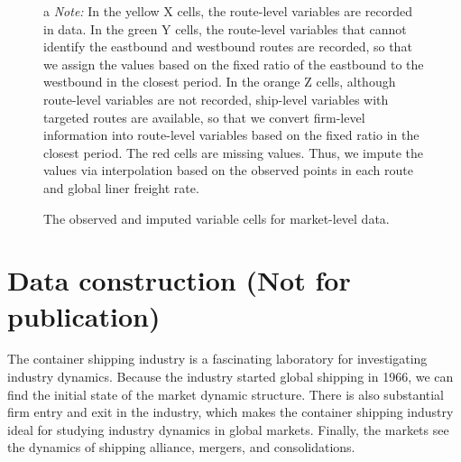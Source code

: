 \begin{landscape}
{\begin{figure}[!ht]
\begin{minipage}[b]{0.45\linewidth}
  \end{minipage}
\caption{The observed and imputed variable cells for market-level data.}
{\tiny{}
\begin{tablenotes}
\item[a]\textit{Note:} In the yellow X cells, the route-level variables are recorded in data. In the green Y cells, the route-level variables that cannot identify the eastbound and westbound routes are recorded, so that we assign the values based on the fixed ratio of the eastbound to the westbound in the closest period. In the orange Z cells, although route-level variables are not recorded, ship-level variables with targeted routes are available, so that we convert firm-level information into route-level variables based on the fixed ratio in the closest period. The red cells are missing values. Thus, we impute the values via interpolation based on the observed points in each route and global liner freight rate.
\end{tablenotes}
}
\end{figure}
}
\end{landscape}

\section{Data construction (Not for publication)}\label{sec:data_construction}

The container shipping industry is a fascinating laboratory for investigating industry dynamics. Because the industry started global shipping in 1966, we can find the initial state of the market dynamic structure. There is also substantial firm entry and exit in the industry, which makes the container shipping industry ideal for studying industry dynamics in global markets. Finally, the markets see the dynamics of shipping alliance, mergers, and consolidations. 

